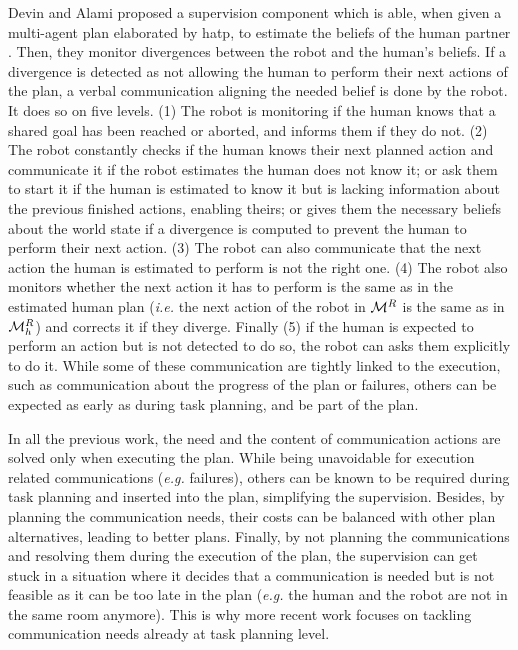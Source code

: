 \documentclass[a4paper,11pt,twoside]{StyleThese}
\begin{document}
Devin and Alami proposed a supervision component which is able, when given a multi-agent plan elaborated by \acrshort{hatp}, to estimate the beliefs of the human partner \cite{devin2016implemented}. Then, they monitor divergences between the robot and the human's beliefs. If a divergence is detected as not allowing the human to perform their next actions of the plan, a verbal communication aligning the needed belief is done by the robot. It does so on five levels. (1) The robot is monitoring  if the human knows that a shared goal has been reached or aborted, and informs them if they do not. (2) The robot constantly checks if the human knows their next planned action and communicate it if the robot estimates the human does not know it; or ask them to start it if the human is estimated to know it but is lacking information about the previous finished actions, enabling theirs; or gives them the necessary beliefs about the world state if a divergence is computed to prevent the human to perform their next action. (3) The robot can also communicate that the next action the human is estimated to perform is not the right one. (4) The robot also monitors whether the next action it has to perform is the same as in the estimated human plan (\textit{i.e.} the next action of the robot in $\mathcal{M}^R$ is the same as in $\mathcal{M}^R_h$) and corrects it if they diverge. Finally (5) if the human is expected to perform an action but is not detected to do so, the robot can asks them explicitly to do it. While some of these communication are tightly linked to the execution, such as communication about the progress of the plan or failures, others can be expected as early as during task planning, and be part of the plan. 

In all the previous work, the need and the content of communication actions are solved only when executing the plan. While being unavoidable for execution related communications (\textit{e.g.} failures), others can be known to be required during task planning and inserted into the plan, simplifying the supervision. Besides, by planning the communication needs, their costs can be balanced with other plan alternatives, leading to better plans. Finally, by not planning the communications and resolving them during the execution of the plan, the supervision can get stuck in a situation where it decides that a communication is needed but is not feasible as it can be too late in the plan (\textit{e.g.} the human and the robot are not in the same room anymore). This is why more recent work focuses on tackling communication needs already at task planning level.
\end{document}
